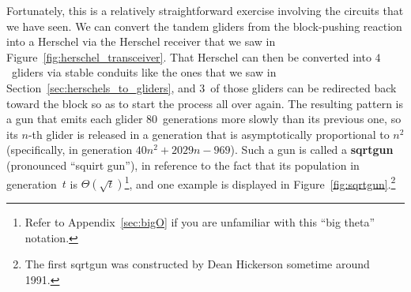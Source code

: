 Fortunately, this is a relatively straightforward exercise involving the circuits that we have seen. We can convert the tandem gliders from the block-pushing reaction into a Herschel via the Herschel receiver that we saw in Figure~\ref{fig:herschel_transceiver}. That Herschel can then be converted into $4$~gliders via stable conduits like the ones that we saw in Section~\ref{sec:herschels_to_gliders}, and $3$~of those gliders can be redirected back toward the block so as to start the process all over again. The resulting pattern is a gun that emits each glider $80$~generations more slowly than its previous one, so its $n$-th glider is released in a generation that is asymptotically proportional to $n^2$ (specifically, in generation $40n^2 + 2029n - 969$). Such a gun is called a \textbf{sqrtgun} (pronounced ``squirt gun''), in reference to the fact that its population in generation~$t$ is $\Theta(\sqrt{t})$\footnote{Refer to Appendix~\ref{sec:bigO} if you are unfamiliar with this ``big theta'' notation.}, and one example is displayed in Figure~\ref{fig:sqrtgun}.\footnote{The first sqrtgun was constructed by Dean Hickerson sometime around 1991.}

